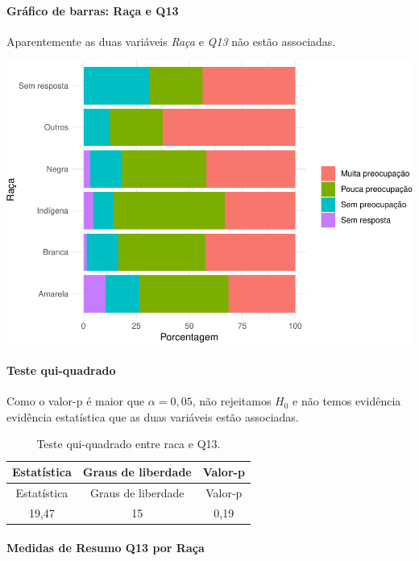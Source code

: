 \documentclass[]{article}
\let\oldparagraph\paragraph
\renewcommand{\paragraph}[1]{\oldparagraph{#1}\mbox{}}
\begin{document}
\hypertarget{gruxe1fico-de-barras-rauxe7a-e-q13}{%
\paragraph{Gráfico de barras: Raça e Q13}\label{gruxe1fico-de-barras-rauxe7a-e-q13}}

Aparentemente as duas variáveis \emph{Raça} e \emph{Q13} não estão associadas.

\begin{center}\includegraphics[width=0.75\linewidth]{relatorio_files/figure-latex/unnamed-chunk-77-1} \end{center}

\hypertarget{teste-qui-quadrado-10}{%
\paragraph{Teste qui-quadrado}\label{teste-qui-quadrado-10}}

Como o valor-p é maior que \(\alpha=0,05\), não rejeitamos \(H_0\) e não temos evidência evidência estatística que as duas variáveis estão associadas.

\begin{longtable}[]{@{}ccc@{}}
\caption{\label{tab:unnamed-chunk-78}Teste qui-quadrado entre raca e Q13.}\tabularnewline
\toprule
Estatística & Graus de liberdade & Valor-p\tabularnewline
\midrule
\endfirsthead
\toprule
Estatística & Graus de liberdade & Valor-p\tabularnewline
\midrule
\endhead
19,47 & 15 & 0,19\tabularnewline
\bottomrule
\end{longtable}

\cleardoublepage

\hypertarget{medidas-de-resumo-q13-por-rauxe7a}{%
\paragraph{Medidas de Resumo Q13 por Raça}\label{medidas-de-resumo-q13-por-rauxe7a}}
\end{document}
